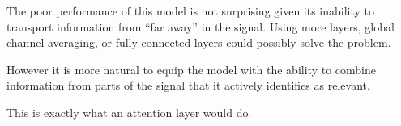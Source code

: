 \documentclass[c,8pt]{beamer}
\begin{document}

\begin{frame}{}{}

The poor performance of this model is not surprising given its
inability to transport information from ``far away'' in the
signal. Using more layers, global channel averaging, or fully
connected layers could possibly solve the problem.

However it is more natural to equip the model with the ability to
combine information from parts of the signal that it actively
identifies as relevant.

This is exactly what an attention layer would do.





\end{frame}

\end{document}
